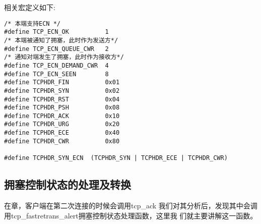             相关宏定义如下:
\begin{verbatim}
/* 本端支持ECN */  
#define TCP_ECN_OK          1
/* 本端被通知了拥塞，此时作为发送方*/
#define TCP_ECN_QUEUE_CWR   2
/* 通知对端发生了拥塞，此时作为接收方*/
#define TCP_ECN_DEMAND_CWR  4
#define TCP_ECN_SEEN        8
#define TCPHDR_FIN          0x01
#define TCPHDR_SYN          0x02
#define TCPHDR_RST          0x04
#define TCPHDR_PSH          0x08
#define TCPHDR_ACK          0x10
#define TCPHDR_URG          0x20
#define TCPHDR_ECE          0x40
#define TCPHDR_CWR          0x80

#define TCPHDR_SYN_ECN  (TCPHDR_SYN | TCPHDR_ECE | TCPHDR_CWR)
\end{verbatim}

    \subsection{拥塞控制状态的处理及转换}
        在\label{ClientReceiveSYN+ACK:tcp_ack}章，客户端在第二次连接的时候会调用tcp\_ack
        我们对其分析后，发现其中会调用tcp\_fastretrans\_alert拥塞控制状态处理函数，这里我
        们就主要讲解这一函数。
